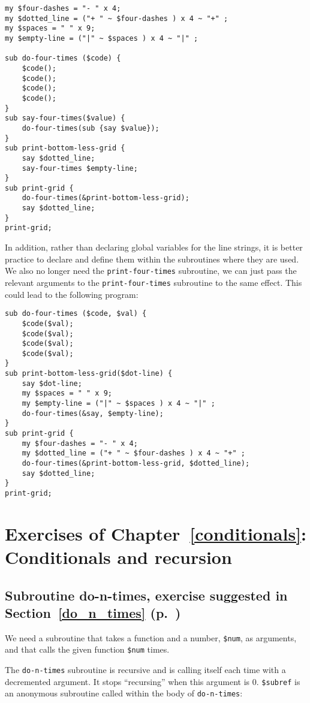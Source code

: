 \begin{verbatim}
my $four-dashes = "- " x 4;
my $dotted_line = ("+ " ~ $four-dashes ) x 4 ~ "+" ;
my $spaces = " " x 9;
my $empty-line = ("|" ~ $spaces ) x 4 ~ "|" ;

sub do-four-times ($code) {
    $code();
    $code();
    $code();
    $code();
}
sub say-four-times($value) {
    do-four-times(sub {say $value});
}
sub print-bottom-less-grid {
    say $dotted_line;
    say-four-times $empty-line;
}
sub print-grid {
    do-four-times(&print-bottom-less-grid);
    say $dotted_line;
}
print-grid;
\end{verbatim}

In addition, rather than declaring global variables for the 
line strings, it is better practice to declare and define them 
within the subroutines where they are used. We also no longer 
need the {\tt print-four-times} subroutine, we can just 
pass the relevant arguments to the {\tt print-four-times} 
subroutine to the same effect. This could lead to the 
following program:

\begin{verbatim}
sub do-four-times ($code, $val) {
    $code($val);
    $code($val);
    $code($val);
    $code($val);
}
sub print-bottom-less-grid($dot-line) {
    say $dot-line;
    my $spaces = " " x 9;
    my $empty-line = ("|" ~ $spaces ) x 4 ~ "|" ;
    do-four-times(&say, $empty-line);
}
sub print-grid {
    my $four-dashes = "- " x 4;
    my $dotted_line = ("+ " ~ $four-dashes ) x 4 ~ "+" ;
    do-four-times(&print-bottom-less-grid, $dotted_line);
    say $dotted_line;
}
print-grid;
\end{verbatim}


\section{Exercises of Chapter~\ref{conditionals}: Conditionals and recursion}

\label{sol_do_n_times}

\subsection{Subroutine do-n-times, exercise suggested in Section~\ref{do_n_times} (p.~\pageref{do_n_times})}

We need a subroutine that takes a function 
and a number, {\tt \$num}, as arguments, and that calls
the given function {\tt \$num} times.

The {\tt do-n-times} subroutine is recursive and is 
calling itself each time with a decremented argument. It 
stops ``recursing'' when this argument is 0. \verb'$subref' is an anonymous subroutine called within the body of 
{\tt do-n-times}:

